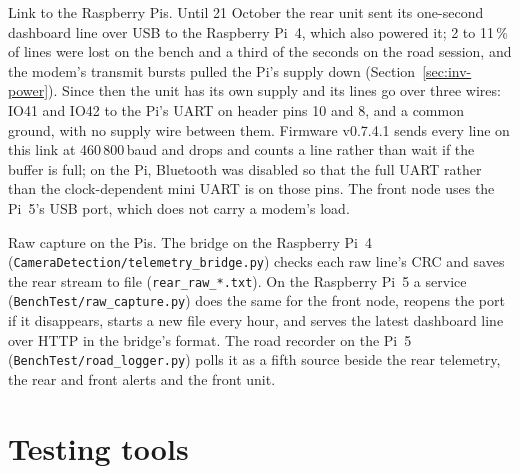 Link to the Raspberry Pis. Until 21 October the rear unit sent its one-second dashboard line over USB to the Raspberry Pi~4, which also powered it; 2 to 11\,\% of lines were lost on the bench and a third of the seconds on the road session, and the modem's transmit bursts pulled the Pi's supply down (Section~\ref{sec:inv-power}). Since then the unit has its own supply and its lines go over three wires: IO41 and IO42 to the Pi's UART on header pins 10 and 8, and a common ground, with no supply wire between them. Firmware v0.7.4.1 sends every line on this link at 460\,800\,baud and drops and counts a line rather than wait if the buffer is full; on the Pi, Bluetooth was disabled so that the full UART rather than the clock-dependent mini UART is on those pins. The front node uses the Pi~5's USB port, which does not carry a modem's load.

Raw capture on the Pis. The bridge on the Raspberry Pi~4 (\texttt{CameraDetection/\allowbreak{}telemetry\_\allowbreak{}bridge.py}) checks each raw line's CRC and saves the rear stream to file (\texttt{rear\_raw\_*.txt}). On the Raspberry Pi~5 a service (\texttt{BenchTest/\allowbreak{}raw\_\allowbreak{}capture.py}) does the same for the front node, reopens the port if it disappears, starts a new file every hour, and serves the latest dashboard line over HTTP in the bridge's format. The road recorder on the Pi~5 (\texttt{BenchTest/\allowbreak{}road\_\allowbreak{}logger.py}) polls it as a fifth source beside the rear telemetry, the rear and front alerts and the front unit.

\section{Testing tools}
\label{sec:impl-tools}

